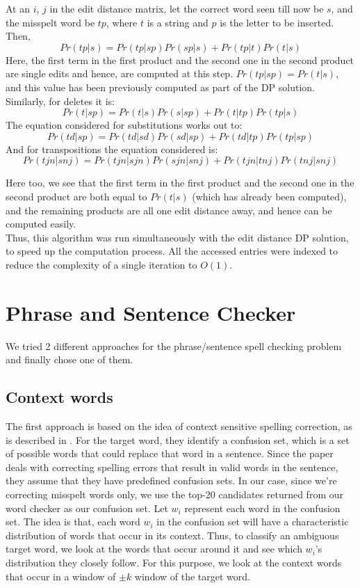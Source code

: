 At an $i$, $j$ in the edit distance matrix, let the correct word seen till now be $s$, and the misspelt word be $tp$, where $t$ is a string and $p$ is the letter to be inserted. Then,
\[Pr(tp|s) = Pr(tp|sp)Pr(sp|s) + Pr(tp|t)Pr(t|s)\]
Here, the first term in the first product and the second one in the second product are single edits and hence, are computed at this step. $Pr(tp|sp) = Pr(t|s)$, and this value has been previously computed as part of the DP solution. Similarly, for deletes it is:
\[Pr(t|sp) = Pr(t|s)Pr(s|sp)+Pr(t|tp)Pr(tp|s)\]
The equation considered for substitutions works out to:
\[Pr(td|sp) = Pr(td|sd)Pr(sd|sp)+Pr(td|tp)Pr(tp|sp)\]
And for transpositions the equation considered is:
\[Pr(tjn|snj) = Pr(tjn|sjn)Pr(sjn|snj)+Pr(tjn|tnj)Pr(tnj|snj)\]

Here too, we see that the first term in the first product and the second one in the second product are both equal to $Pr(t|s)$ (which has already been computed), and the remaining products are all one edit distance away, and hence can be computed easily.\\

Thus, this algorithm was run simultaneously with the edit distance DP solution, to speed up the computation process. All the accessed entries were indexed to reduce the complexity of a single iteration to $O(1)$.

\section{Phrase and Sentence Checker}
We tried 2 different approaches for the phrase/sentence spell checking problem and finally chose one of them.
\subsection{Context words}
The first approach is based on the idea of context sensitive spelling correction, as is described in \cite{golding}. For the target word, they identify a confusion set, which is a set of possible words that could replace that word in a sentence. Since the paper deals with correcting spelling errors that result in valid words in the sentence, they assume that they have predefined confusion sets. In our case, since we're correcting misspelt words only, we use the top-20 candidates returned from our word checker as our confusion set. Let $w_i$ represent each word in the confusion set. The idea is that, each word $w_i$ in the confusion set will have a
characteristic distribution of words that occur in its context. Thus, to classify an ambiguous target word, we look at the words that occur around it and see which $w_i$'s distribution they closely follow. For this purpose, we look at the context words that occur in a window of $\pm k$ window of the target word. 

